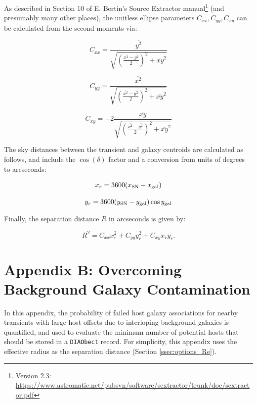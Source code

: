 \documentclass[DM,authoryear,toc]{lsstdoc}
\begin{document}
As described in Section 10 of E. Bertin's Source Extractor manual\footnote{Version 2.3: \url{https://www.astromatic.net/pubsvn/software/sextractor/trunk/doc/sextractor.pdf}} (and presumably many other places), the unitless ellipse parameters $C_{xx},C_{yy},C_{xy}$ can be calculated from the second moments via:

\begin{equation}
C_{xx} = \frac{\overline{y^2}}{\sqrt{ \left( \frac{\overline{x^2}-\overline{y^2}}{2} \right)^2 + \overline{xy}^2}}
\end{equation}

\begin{equation}
C_{yy} = \frac{\overline{x^2}}{\sqrt{ \left( \frac{\overline{x^2}-\overline{y^2}}{2} \right)^2 + \overline{xy}^2}}
\end{equation}

\begin{equation}
C_{xy} = -2 \frac{\overline{xy}}{\sqrt{ \left( \frac{\overline{x^2}-\overline{y^2}}{2} \right)^2 + \overline{xy}^2}}
\end{equation}

The sky distances between the transient and galaxy centroids are calculated as follows, and include the $\cos(\delta)$ factor and a conversion from units of degrees to arcseconds:

\begin{equation}
x_r = 3600(x_{\rm SN} - x_{\rm gal})
\end{equation}

\begin{equation}
y_r = 3600(y_{\rm SN} - y_{\rm gal})\cos{y_{\rm gal}}
\end{equation}

Finally, the separation distance $R$ in arcseconds is given by:

\begin{equation}
R^2 = C_{xx} x_r^2 + C_{yy} y_r^2 + C_{xy} x_r y_r.
\end{equation}


\clearpage
\section{Appendix B: Overcoming Background Galaxy Contamination}\label{sec:appB}

In this appendix, the probability of failed host galaxy associations for nearby transients with large host offsets due to interloping background galaxies is quantified, and used to evaluate the minimum number of potential hosts that should be stored in a {\tt DIAObect} record. 
For simplicity, this appendix uses the effective radius as the separation distance (Section \ref{ssec:options_Re}).
\end{document}
